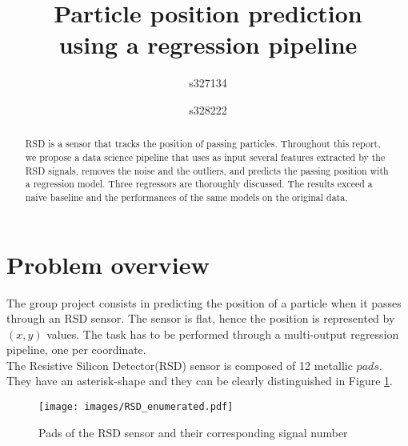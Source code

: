 \documentclass[conference]{IEEEtran}
\begin{document}
\title{Particle position prediction \\ using a regression pipeline}

\author{
s327134 \\
\and
{}
s328222 \\
}

\maketitle

\begin{abstract}
RSD is a sensor that tracks the position of passing particles. Throughout this report, we propose a data science pipeline that uses as input several features extracted by the RSD signals, removes the noise and the outliers, and predicts the passing position with a regression model. Three regressors are thoroughly discussed. The results exceed a naive baseline and the performances of the same models on the original data.
\end{abstract}

\section{Problem overview}
\label{sec:problemOverview}
The group project consists in predicting the position of a particle when it passes through an RSD sensor. The sensor is flat, hence the position is represented by $(x, y)$ values. 
The task has to be performed through a multi-output regression pipeline, one per coordinate. \\
The Resistive Silicon Detector(RSD) sensor is composed of 12 metallic $pads$. They have an asterisk-shape and they can be clearly distinguished in Figure \ref{fig:rsd}.\\

\begin{figure}[htbp]
\centerline{\texttt{[image: images/RSD\_enumerated.pdf]}}
\caption{Pads of the RSD sensor and their corresponding signal number}
\label{fig:rsd}
\end{figure}
\end{document}
